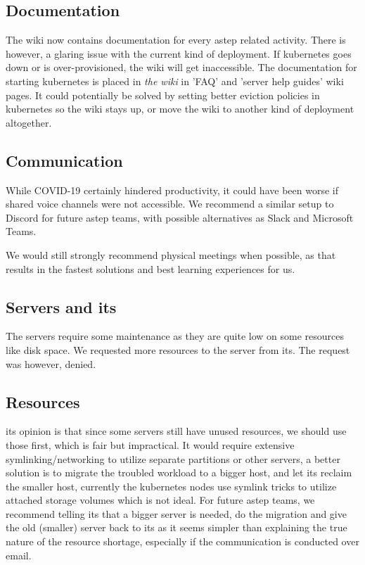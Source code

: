 \FloatBarrier
{}

\subsection*{Documentation}
The wiki now contains documentation for every \gls{astep} related activity. There is however, a glaring issue with the current kind of deployment. If \gls{kubernetes} goes down or is over-provisioned, the wiki will get inaccessible. The documentation for starting \gls{kubernetes} is placed in \emph{the wiki} in 'FAQ' and 'server help guides' wiki pages.
It could potentially be solved by setting better eviction policies in \gls{kubernetes} so the wiki stays up, or move the wiki to another kind of deployment altogether.

\subsection*{Communication}
While COVID-19 certainly hindered productivity, it could have been worse if shared voice channels were not accessible. We recommend a similar setup to Discord for future \gls{astep} teams, with possible alternatives as Slack and Microsoft Teams.

We would still strongly recommend physical meetings when possible, as that results in the fastest solutions and best learning experiences for us. 

\subsection*{Servers and \gls{its}}
The servers require some maintenance as they are quite low on some resources like disk space. We requested more resources to the server from \gls{its}. The request was however, denied.


\subsection*{Resources}
\gls{its}  opinion is that since some servers still have unused resources, we should use those first, which is fair but impractical. 
It would require extensive symlinking/networking to utilize separate partitions or other servers, a better solution is to migrate the troubled workload to a bigger host, and let \gls{its} reclaim the smaller host, currently the \gls{kubernetes} nodes use symlink tricks to utilize attached storage volumes which is not ideal.
For future \gls{astep} teams, we recommend telling \gls{its} that a bigger server is needed, do the migration and give the old (smaller) server back to \gls{its} as it seems simpler than explaining the true nature of the resource shortage, especially if the communication is conducted over email.

